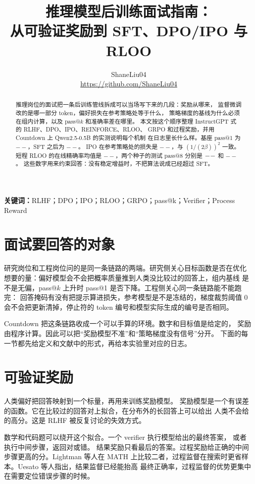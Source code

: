 \documentclass[10pt,twocolumn,a4paper]{ctexart}
\title{\vspace{-1.2em}\textbf{推理模型后训练面试指南：\\
从可验证奖励到 SFT、DPO/IPO 与 RLOO}}
\author{ShaneLiu04\\
\small\url{https://github.com/ShaneLiu04}}
\date{}
\providecommand{\PassBaseOne}{--}\providecommand{\PassSftOne}{--}
\providecommand{\IpoLossStart}{--}\providecommand{\IpoEvalLoss}{--}
\providecommand{\RlooKEightExactMean}{--}\providecommand{\RlooKEightRewardMean}{--}
\providecommand{\PassRlooKEightSeedOneEight}{--}
\begin{document}
\maketitle
\thispagestyle{fancy}

\begin{abstract}
推理岗位的面试把一条后训练管线拆成可以当场写下来的几段：奖励从哪来，
监督微调改的是哪一部分 token，偏好损失在参考策略处等于什么，
策略梯度的基线为什么必须在组内计算，以及 pass@$k$ 和准确率差在哪里。
本文按这个顺序整理 InstructGPT 式的 RLHF、DPO、IPO、REINFORCE、RLOO、
GRPO 和过程奖励，并用 Countdown 上 Qwen2.5-0.5B 的实测说明每个机制
在日志里长什么样。基座 pass@1 为 $\PassBaseOne$，SFT 之后为 $\PassSftOne$。
IPO 在参考策略处的损失是 $\IpoLossStart$，与 $(1/(2\beta))^2$ 一致。
短程 RLOO 的在线精确率均值是 $\RlooKEightExactMean$，两个种子的测试
pass@8 分别是 $--$ 和 $\PassRlooKEightSeedOneEight$。
这些数字用来约束回答：没有稳定增益时，不把算法说成已经超过 SFT。
\end{abstract}

\textbf{关键词：}RLHF；DPO；IPO；RLOO；GRPO；pass@k；Verifier；Process Reward

\section{面试要回答的对象}
研究岗位和工程岗位问的是同一条链路的两端。研究侧关心目标函数是否在优化
想要的量：偏好模型会不会把概率质量推到人类没比较过的回答上，组内基线
是不是无偏，pass@$k$ 上升时 pass@1 是否下降。工程侧关心同一条链路能不能跑完：
回答掩码有没有把提示算进损失，参考模型是不是冻结的，梯度裁剪阈值 $0$
会不会把更新清掉，停止符的 token 编号和模型实际生成的编号是否相同。

Countdown 把这条链路收成一个可以手算的环境。数字和目标值是给定的，
奖励由程序计算。因此可以把``奖励模型不准''和``策略梯度没有信号''分开。
下面的每一节都先给定义和文献中的形式，再给本实验里对应的日志。

\section{可验证奖励}
人类偏好把回答映射到一个标量，再用来训练奖励模型\citep{christiano2017preferences,ziegler2019finetune,stiennon2020summarize,ouyang2022instructgpt}。
奖励模型是一个有误差的函数。它在比较过的回答对上拟合，在分布外的长回答上可以给出
人类不会给的高分。这是 RLHF 被反复讨论的失效方式\citep{casper2023open,zheng2023secrets}。

数学和代码题可以绕开这个拟合。一个 verifier 执行模型给出的最终答案，
或者执行中间步骤，返回对或错\citep{cobbe2021gsm8k,uesato2022outcome,lightman2023verify}。
结果奖励只看最后的答案。过程奖励给正确的中间步骤更高的分。Lightman 等人在
MATH 上比较二者，过程监督在搜索时更省样本。Uesato 等人指出，结果监督已经能抬高
最终正确率，过程监督的优势更集中在需要定位错误步骤的时候。
\end{document}
